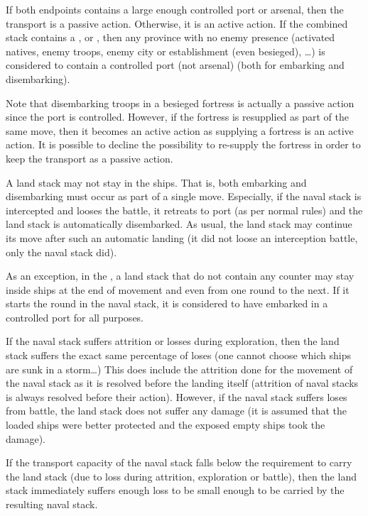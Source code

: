 If both endpoints contains a large enough controlled port or arsenal, then the
transport is a passive action. Otherwise, it is an active action. If the
combined stack contains a \LeaderE, \LeaderC or \LeaderGov, then any province
with no enemy presence (activated natives, enemy troops, enemy city or
establishment (even besieged), \ldots) is considered to contain a controlled
port (not arsenal) (both for embarking and disembarking).

Note that disembarking troops in a besieged fortress is actually a passive
action since the port is controlled. However, if the fortress is resupplied as
part of the same move, then it becomes an active action as supplying a
fortress is an active action. It is possible to decline the possibility to
re-supply the fortress in order to keep the transport as a passive action.

A land stack may not stay in the ships. That is, both embarking and
disembarking must occur as part of a single move. Especially, if the naval
stack is intercepted and looses the battle, it retreats to port (as per normal
rules) and the land stack is automatically disembarked. As usual, the land
stack may continue its move after such an automatic landing (it did not loose
an interception battle, only the naval stack did).

As an exception, in the \ROTW, a land stack that do not contain any \ARMY
counter may stay inside ships at the end of movement and even from one round
to the next. If it starts the round in the naval stack, it is considered to
have embarked in a controlled port for all purposes.

If the naval stack suffers attrition or losses during exploration, then the
land stack suffers the exact same percentage of loses (one cannot choose which
ships are sunk in a storm\ldots) This does include the attrition done for the
movement of the naval stack as it is resolved before the landing itself
(attrition of naval stacks is always resolved before their action). However,
if the naval stack suffers loses from battle, the land stack does not suffer
any damage (it is assumed that the loaded ships were better protected and the
exposed empty ships took the damage).

If the transport capacity of the naval stack falls below the requirement to
carry the land stack (due to loss during attrition, exploration or battle),
then the land stack immediately suffers enough loss to be small enough to be
carried by the resulting naval stack.

